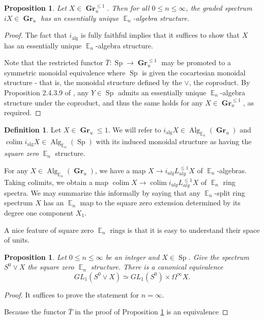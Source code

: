 \documentclass[reqno, oneside]{amsart}
\theoremstyle{definition}
\newtheorem{dfn}[nul]{Definition}
\theoremstyle{plain}
\newtheorem{prop}[nul]{Proposition}
\DeclareMathOperator*{\colim}{\text{colim}}
\DeclareMathOperator{\E}{\mathbb{E}}
\DeclareMathOperator{\Gr}{\textbf{Gr}}
\DeclareMathOperator{\Alg}{\text{Alg}}
\DeclareMathOperator{\Sp}{\text{Sp}}
\begin{document}
\begin{prop}\label{prop:sq0unique}
Let $X\in \Gr_u^{\leq 1}.$  Then for all $0\leq n\leq \infty$, the graded spectrum $iX\in \Gr_u$ has an essentially unique $\E_n$-algebra structure.  %
\end{prop}
\begin{proof}
The fact that $i_{\text{alg}}$ is fully faithful implies that it suffices to show that $X$ has an essentially unique $\E_n$-algebra structure.  

Note that the restricted functor $\bar{T}: \Sp \to \Gr^{\leq 1}_u$ may be promoted to a symmetric monoidal equivalence where $\Sp$ is given the cocartesian monoidal structure - that is, the monoidal structure defined by the $\vee$, the coproduct.   By Proposition 2.4.3.9 of \cite{HA}, any $Y\in \Sp$ admits an essentially unique $\E_n$-algebra structure under the coproduct, and thus the same holds for any $X\in \Gr^{\leq 1}_u$, as required.  
\end{proof}

\begin{dfn}
Let $X\in \Gr_u{\leq 1}$.  We will refer to $i_{\text{alg}}X\in \Alg_{\E_n}(\Gr_u)$ and $\colim i_{\text{alg}}X\in \Alg_{\E_n}(\Sp)$ with its induced monoidal structure as having the \emph{square zero} $\E_n$ structure.
\end{dfn}

For any $X\in \Alg_{\E_n}(\Gr_u)$, we have a map $X\to i_{alg}L^{\leq 1}_{alg}X$ of $\E_n$-algebras.  Taking colimits, we obtain a map $\colim X \to \colim i_{alg}L^{\leq 1}_{alg}X$ of $\E_n$ ring spectra.
 We may summarize this informally by saying that any $\E_n$-split ring spectrum $X$ has an $\E_n$ map to the square zero extension determined by its degree one component $X_1$.  

A nice feature of square zero $\E_n$ rings is that it is easy to understand their space of units.  

\begin{prop}
Let $0\leq n\leq \infty$ be an integer and $X\in \Sp$.  Give the spectrum $S^0\vee X$ the square zero $\E_n$ structure.  There is a canonical equivalence $$GL_1(S^0\vee X) \simeq GL_1(S^0) \times \Omega^{\infty} X.$$
\end{prop}
\begin{proof}
It suffices to prove the statement for $n=\infty.$  


Because the functor $\bar{T}$ in the proof of Proposition \ref{prop:sq0unique} is an equivalence

\end{proof}
\end{document}
